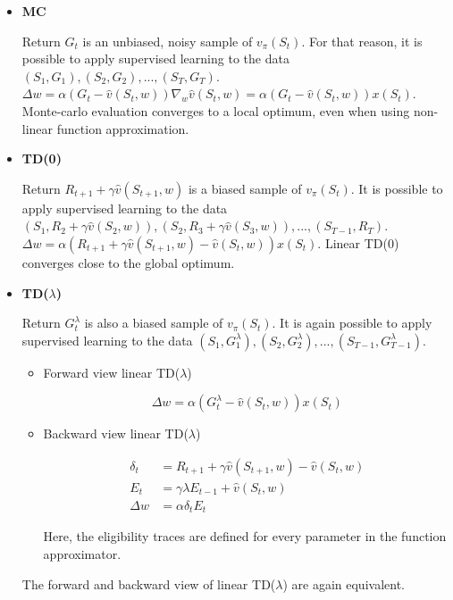 \begin{itemize}
	\item \textbf{MC}
	
	Return $G_t$ is an unbiased, noisy sample of $v_\pi(S_t)$. For that reason, it is possible to apply supervised learning to the data $(S_1, G_1), (S_2, G_2), ..., (S_T, G_T)$. $\Delta w = \alpha (G_t - \hat{v}(S_t, w)) \nabla_w \hat{v}(S_t, w) = \alpha (G_t - \hat{v}(S_t, w)) x(S_t)$. Monte-carlo evaluation converges to a local optimum, even when using non-linear function approximation.
	
	\item \textbf{TD(0)}
		
	Return $R_{t+1} + \gamma \hat{v}(S_{t+1}, w)$ is a biased sample of $v_\pi(S_t)$. It is possible to apply supervised learning to the data $(S_1, R_2 + \gamma \hat{v}(S_2, w)), (S_2, R_3 + \gamma \hat{v}(S_3, w)), ..., (S_{T-1}, R_T)$. $\Delta w = \alpha (R_{t+1} + \gamma \hat{v}(S_{t+1}, w) - \hat{v}(S_t, w)) x(S_t)$. Linear TD(0) converges close to the global optimum.
	
	\item \textbf{TD($\lambda$)}
	
	Return $G^\lambda_t$ is also a biased sample of $v_\pi(S_t)$. It is again possible to apply supervised learning to the data $(S_1, G^\lambda_1), (S_2, G^\lambda_2), ..., (S_{T-1}, G^\lambda_{T-1})$. 
	
	\begin{itemize}
		\item Forward view linear TD($\lambda$)
		
		\begin{equation*}
			\Delta w = \alpha (G^\lambda_t - \hat{v}(S_t, w)) x(S_t)
		\end{equation*}
			
		\item Backward view linear TD($\lambda$)
		
		\begin{equation*}
			\begin{aligned}
				\delta_t & = R_{t+1} + \gamma \hat{v}(S_{t+1}, w) - \hat{v}(S_t, w)\\
				E_t 	 & = \gamma \lambda E_{t-1} + \hat{v}(S_t, w)\\
				\Delta w & = \alpha \delta_t E_t
			\end{aligned}
		\end{equation*}
		
		Here, the eligibility traces are defined for every parameter in the function approximator.
				
	\end{itemize}
	The forward and backward view of linear TD($\lambda$) are again equivalent.
\end{itemize}

